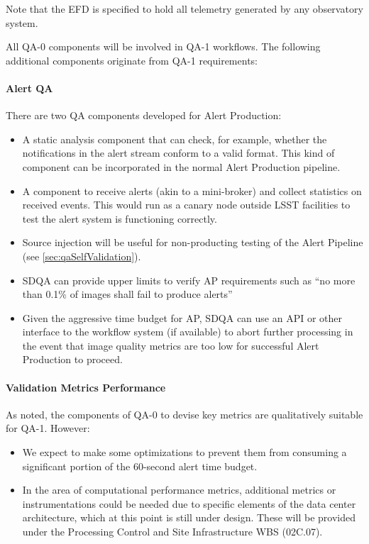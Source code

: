 Note that the EFD is specified to hold all telemetry generated by any observatory system.

All QA-0 components will be involved in QA-1 workflows. The following additional components originate from QA-1 requirements:

\paragraph{Alert QA}
\label{sec:qaAlertQA}

There are two QA components developed for Alert Production:

\begin{itemize}

\item A static analysis component that can check, for example, whether the notifications in the alert stream conform to a valid format. This kind of component can be incorporated in the normal Alert Production pipeline.

\item A component to receive alerts (akin to a mini-broker) and collect statistics on received events. This would run as a canary node outside LSST facilities to test the alert system is functioning correctly.

\item Source injection will be useful for non-producting testing of the Alert Pipeline (see \ref{sec:qaSelfValidation}).

\item SDQA can provide upper limits to verify AP requirements such as ``no more than 0.1\% of images shall fail to produce alerts''

\item Given the aggressive time budget for AP, SDQA can use an API or other interface to the workflow system (if available) to abort further processing in the event that image quality metrics are too low for successful Alert Production to proceed.

\end{itemize}

\paragraph{Validation Metrics Performance}
\label{sec:qaPerfValidate}

As noted, the components of QA-0 to devise key metrics are qualitatively suitable for QA-1. However:

\begin{itemize}

\item We expect to make some optimizations to prevent them from consuming a significant portion of the 60-second alert time budget.

\item In the area of computational performance metrics, additional metrics or instrumentations could be needed due to specific elements of the data center architecture, which at this point is still under design. These will be provided under the Processing Control and Site Infrastructure WBS (02C.07).

\end{itemize}

